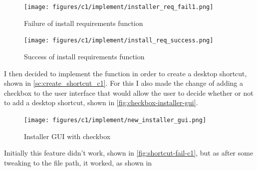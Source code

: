 \documentclass[11pt]{article}
\begin{document}


            \begin{figure}[!ht]
                \centering
                \texttt{[image: figures/c1/implement/installer\_req\_fail1.png]}
                \caption{Failure of install requirements function}
                \label{fig:install_reqs_fail_pf_c1}
            \end{figure}
            
            \begin{figure}[!h]
                \centering
                \texttt{[image: figures/c1/implement/install\_req\_success.png]}
                \caption{Success of install requirements function}
                \label{fig:install-req-success}
            \end{figure}

            I then decided to implement the function in order to create a desktop shortcut, shown in \autoref{sc:create_shortcut_c1}. For this I also made the change of adding a checkbox to the user interface that would allow the user to decide whether or not to add a desktop shortcut, shown in \autoref{fig:checkbox-installer-gui}. 


            \begin{figure}[!h]
                \centering
                \texttt{[image: figures/c1/implement/new\_installer\_gui.png]}
                \caption{Installer GUI with checkbox}
                \label{fig:checkbox-installer-gui}
            \end{figure}

            Initially this feature didn't work, shown in \autoref{fig:shortcut-fail-c1}, but as after some tweaking to the file path, it worked, as shown in 
\end{document}

